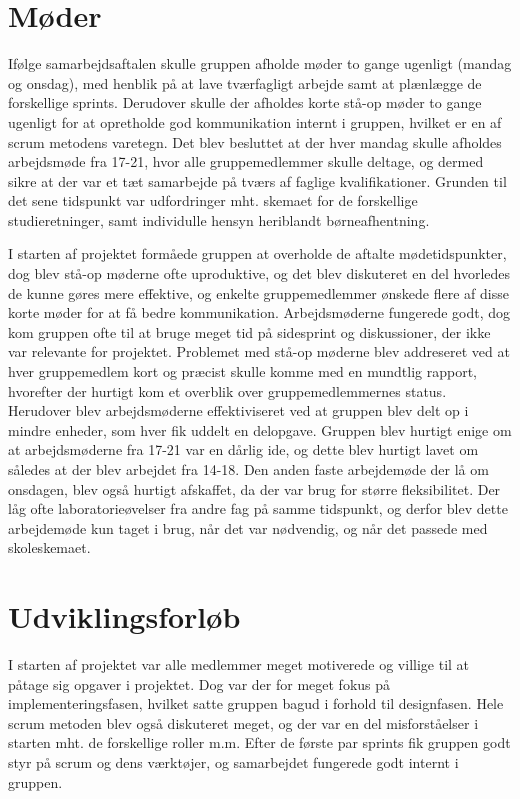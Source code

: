 \section*{Møder}
Ifølge samarbejdsaftalen skulle gruppen afholde møder to gange ugenligt (mandag og onsdag), med henblik på at lave tværfagligt arbejde samt at plænlægge de forskellige sprints. Derudover skulle der afholdes korte stå-op møder to gange ugenligt for at opretholde god kommunikation internt i gruppen, hvilket er en af scrum metodens varetegn.
Det blev besluttet at der hver mandag skulle afholdes arbejdsmøde fra 17-21, hvor alle gruppemedlemmer skulle deltage, og dermed sikre at der var et tæt samarbejde på tværs af faglige kvalifikationer. Grunden til det sene tidspunkt var udfordringer mht. skemaet for de forskellige studieretninger, samt individulle hensyn heriblandt børneafhentning. 

I starten af projektet formåede gruppen at overholde de aftalte mødetidspunkter, dog blev stå-op møderne ofte uproduktive, og det blev diskuteret en del hvorledes de kunne gøres mere effektive, og enkelte gruppemedlemmer ønskede flere af disse korte møder for at få bedre kommunikation. Arbejdsmøderne fungerede godt, dog kom gruppen ofte til at bruge meget tid på sidesprint og diskussioner, der ikke var relevante for projektet.
Problemet med stå-op møderne blev addreseret ved at hver gruppemedlem kort og præcist skulle komme med en mundtlig rapport, hvorefter der hurtigt kom et overblik over gruppemedlemmernes status. Herudover blev arbejdsmøderne effektiviseret ved at gruppen blev delt op i mindre enheder, som hver fik uddelt en delopgave. 
Gruppen blev hurtigt enige om at arbejdsmøderne fra 17-21 var en dårlig ide, og dette blev hurtigt lavet om således at der blev arbejdet fra 14-18. Den anden faste arbejdemøde der lå om onsdagen, blev også hurtigt afskaffet, da der var brug for større fleksibilitet. Der låg ofte laboratorieøvelser fra andre fag på samme tidspunkt, og derfor blev dette arbejdemøde kun taget i brug, når det var nødvendig, og når det passede med skoleskemaet.    

\section*{Udviklingsforløb}

I starten af projektet var alle medlemmer meget motiverede og villige til at påtage sig opgaver i projektet. Dog var der for meget fokus på implementeringsfasen, hvilket satte gruppen bagud i forhold til designfasen.
Hele scrum metoden blev også diskuteret meget, og der var en del misforståelser i starten mht. de forskellige roller m.m. Efter de første par sprints fik gruppen godt styr på scrum og dens værktøjer, og samarbejdet fungerede godt internt i gruppen.

